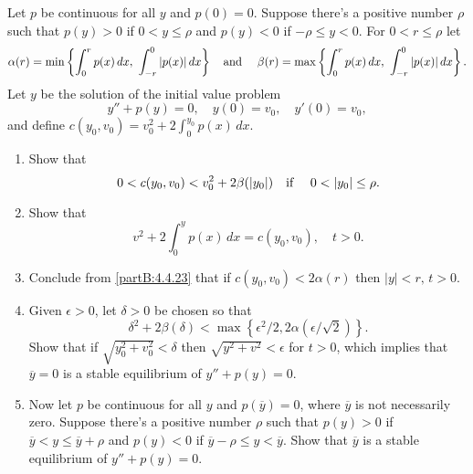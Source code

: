 \documentclass{ximera}
\begin{document}
\begin{problem}\label{exer:4.4.23}
Let $p$ be continuous for all $y$ and $p(0)=0$. Suppose there's
a positive number $\rho$ such that $p(y)>0$ if $0<y\le \rho$ and
$p(y)<0$ if $-\rho\le y<0$. For $0<r\le\rho$ let
$$
\alpha(r)=\min\left\{\int_0^r p(x)\,dx,\ \int_{-r}^0
|p(x)|\,dx\right\}
\mbox{\quad and \quad}
\beta(r)=\max\left\{\int_0^r p(x)\,dx,\ \int_{-r}^0
|p(x)|\,dx\right\}.
$$
Let $y$ be the solution of the initial value problem
$$
y''+p(y)=0,\quad y(0)=v_0,\quad y'(0)=v_0,
$$
and define
$c(y_0,v_0)=v_0^2+2\int_0^{y_0}p(x)\,dx$.
\begin{enumerate}
\item %
Show that
$$
0<c(y_0,v_0) <v_0^2+2\beta(|y_0|)\mbox{\quad if \quad} 0<|y_0|\le\rho.
$$
\item\label{partB:4.4.23} %
Show that
$$
v^2+2\int_0^y p(x)\,dx=c(y_0,v_0),\quad t>0.
$$
\item %
Conclude from \ref{partB:4.4.23} that if $c(y_0,v_0)<2\alpha(r)$ then $|y|<r,\,t>0$.
\item %
Given $\epsilon>0$, let  $\delta>0$ be chosen so that
$$
\delta^2+2\beta(\delta)<\max\left\{\epsilon^2/2,2\alpha(\epsilon/\sqrt2)
\right\}.
$$
Show that if $\sqrt{y_0^2+v_0^2}<\delta$ then
$\sqrt{y^2+v^2}<\epsilon$ for $t>0$, which implies that $\overline
  y=0$ is a stable equilibrium of $y''+p(y)=0$.
\item %
Now let $p$
be continuous for all $y$ and $p(\overline y)=0$, where $\overline y$
is not necessarily zero. Suppose there's a positive number
$\rho$ such that $p(y)>0$ if $\overline y<y\le \overline y+\rho$ and
$p(y)<0$ if $\overline y-\rho\le y<\overline y$. Show that $\overline
y$ is a stable equilibrium of $y''+p(y)=0$.
\end{enumerate}
\end{problem}
\end{document}
